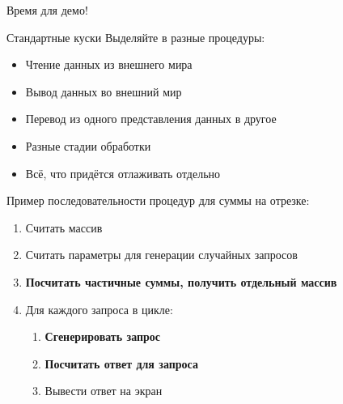 \begin{frame}{Время для демо!}
\end{frame}

\begin{frame}{Стандартные куски}
	Выделяйте в разные процедуры:
	\begin{itemize}
	\item Чтение данных из внешнего мира
	\item Вывод данных во внешний мир
	\item Перевод из одного представления данных в другое
	\item Разные стадии обработки
	\item Всё, что придётся отлаживать отдельно
	\end{itemize}
	
	Пример последовательности процедур для суммы на отрезке:
	\begin{enumerate}
	\item Считать массив
	\item Считать параметры для генерации случайных запросов
	\item \textbf{Посчитать частичные суммы, получить отдельный массив}
	\item Для каждого запроса в цикле:
		\begin{enumerate}
		\item \textbf{Сгенерировать запрос}
		\item \textbf{Посчитать ответ для запроса}
		\item Вывести ответ на экран
		\end{enumerate}
	\end{enumerate}
\end{frame}
